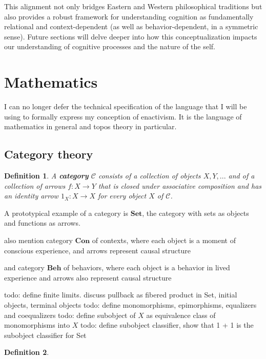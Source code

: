 \documentclass{article}
\newtheorem{definition}{Definition}[section]
\begin{document}
This alignment not only bridges Eastern and Western philosophical traditions but also provides a robust framework for understanding cognition as fundamentally relational and context-dependent (as well as behavior-dependent, in a symmetric sense). Future sections will delve deeper into how this conceptualization impacts our understanding of cognitive processes and the nature of the self.

\section{Mathematics}
I can no longer defer the technical specification of the language that I will be using to formally express my conception of enactivism. It is the language of mathematics in general and topos theory in particular.

\subsection{Category theory}

\begin{definition} A \textbf{category} $\mathcal{C}$ consists of a collection of objects $X, Y, ...$ and of a collection of arrows $f \colon X \to Y$ that is closed under associative composition and has an identity arrow $1_X \colon X \to X$ for every object $X$ of $\mathcal{C}$.
\end{definition}

A prototypical example of a category is $\mathbf{Set}$, the category with sets as objects and functions as arrows.

also mention category $\mathbf{Con}$ of contexts, where each object is a moment of conscious experience, and arrows represent causal structure

and category $\mathbf{Beh}$ of behaviors, where each object is a behavior in lived experience and arrows also represent causal structure

todo: define finite limits. discuss pullback as fibered product in Set, initial objects, terminal objects 
todo: define monomorphisms, epimorphisms, equalizers and coequalizers 
todo: define subobject of $X$ as equivalence class of monomorphisms into $X$ 
todo: define subobject classifier, show that 1 + 1 is the subobject classifier for Set 
\begin{definition}

\end{definition}
\end{document}
